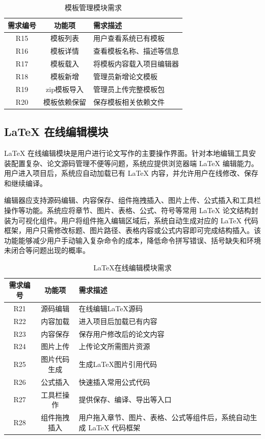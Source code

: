 \documentclass{xduugthesis}
\begin{document}
\begin{table}[!ht]
    \centering
    \caption{模板管理模块需求}
    \label{tab:template-requirement}
    \begin{tabular}{|c|c|p{7cm}|}
        \hline
        需求编号 & 功能项 & 需求描述 \\
        \hline
        R15 & 模板列表 & 用户查看系统已有模板 \\
        \hline
        R16 & 模板详情 & 查看模板名称、描述等信息 \\
        \hline
        R17 & 模板载入 & 将模板内容载入项目编辑器 \\
        \hline
        R18 & 模板新增 & 管理员新增论文模板 \\
        \hline
        R19 & zip模板导入 & 管理员上传完整模板包 \\
        \hline
        R20 & 模板依赖保留 & 保存模板相关依赖文件 \\
        \hline
    \end{tabular}
\end{table}

\subsection{LaTeX 在线编辑模块}
LaTeX 在线编辑模块是用户进行论文写作的主要操作界面。针对本地编辑工具安装配置复杂、论文源码管理不便等问题，系统应提供浏览器端 LaTeX 编辑能力。用户进入项目后，系统应自动加载已有 LaTeX 内容，并允许用户在线修改、保存和继续编译。

编辑器应支持源码编辑、内容保存、组件拖拽插入、图片上传、公式插入和工具栏操作等功能。系统应将章节、图片、表格、公式、符号等常用 LaTeX 论文结构封装为可视化组件。用户将组件拖入编辑区域后，系统自动生成对应的 LaTeX 代码框架，用户只需修改标题、图片路径、表格内容或公式内容即可完成结构插入。该功能能够减少用户手动输入复杂命令的成本，降低命令拼写错误、括号缺失和环境未闭合等问题出现的概率。

\begin{table}[!ht]
    \centering
    \caption{LaTeX在线编辑模块需求}
    \label{tab:latex-editor-requirement}
    \begin{tabular}{|c|c|p{7cm}|}
        \hline
        需求编号 & 功能项 & 需求描述 \\
        \hline
        R21 & 源码编辑 & 在线编辑LaTeX源码 \\
        \hline
        R22 & 内容加载 & 进入项目后加载已有内容 \\
        \hline
        R23 & 内容保存 & 保存用户修改后的论文内容 \\
        \hline
        R24 & 图片上传 & 上传论文所需图片资源 \\
        \hline
        R25 & 图片代码生成 & 生成LaTeX图片引用代码 \\
        \hline
        R26 & 公式插入 & 快速插入常用公式代码 \\
        \hline
        R27 & 工具栏操作 & 提供保存、编译、导出等入口 \\
        \hline
        R28 & 组件拖拽插入 & 用户拖入章节、图片、表格、公式等组件后，系统自动生成 LaTeX 代码框架 \\
        \hline
    \end{tabular}
\end{table}
\end{document}
